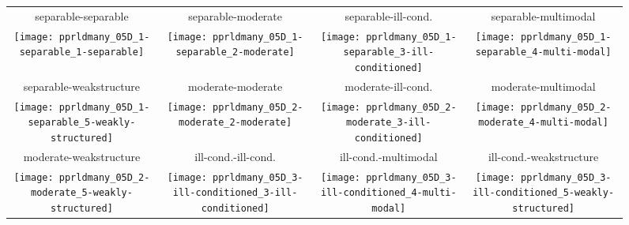 \documentclass{sig-alternate}
\begin{document}



\begin{figure*}
\begin{tabular}{@{\hspace*{-0.009\textwidth}}c@{\hspace*{-0.014\textwidth}}c@{\hspace*{-0.016\textwidth}}c@{\hspace*{-0.02\textwidth}}c}
separable-separable & separable-moderate & separable-ill-cond. & separable-multimodal\\
\texttt{[image: pprldmany\_05D\_1-separable\_1-separable]} &
\texttt{[image: pprldmany\_05D\_1-separable\_2-moderate]} &
\texttt{[image: pprldmany\_05D\_1-separable\_3-ill-conditioned]} &
\texttt{[image: pprldmany\_05D\_1-separable\_4-multi-modal]}\\
separable-weakstructure & moderate-moderate & moderate-ill-cond. & moderate-multimodal\\
\texttt{[image: pprldmany\_05D\_1-separable\_5-weakly-structured]} &
\texttt{[image: pprldmany\_05D\_2-moderate\_2-moderate]} &
\texttt{[image: pprldmany\_05D\_2-moderate\_3-ill-conditioned]} &
\texttt{[image: pprldmany\_05D\_2-moderate\_4-multi-modal]}\\
moderate-weakstructure & ill-cond.-ill-cond. & ill-cond.-multimodal & ill-cond.-weakstructure\\
\texttt{[image: pprldmany\_05D\_2-moderate\_5-weakly-structured]} &
\texttt{[image: pprldmany\_05D\_3-ill-conditioned\_3-ill-conditioned]} &
\texttt{[image: pprldmany\_05D\_3-ill-conditioned\_4-multi-modal]} &
\texttt{[image: pprldmany\_05D\_3-ill-conditioned\_5-weakly-structured]} \\

\end{tabular}
\end{figure*}
\end{document}
